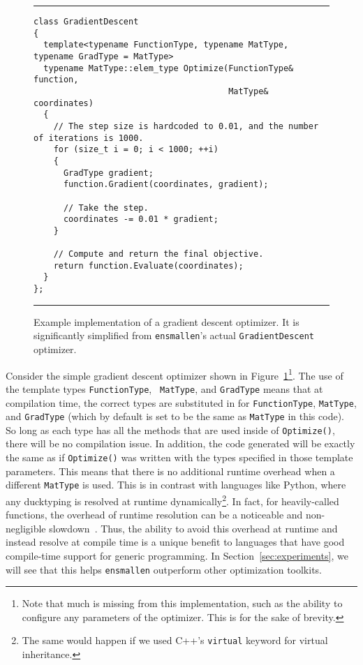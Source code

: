 \begin{figure}[t]
\hrule
\vspace{1ex}
\begin{verbatim}
class GradientDescent
{
  template<typename FunctionType, typename MatType, typename GradType = MatType>
  typename MatType::elem_type Optimize(FunctionType& function,
                                       MatType& coordinates)
  {
    // The step size is hardcoded to 0.01, and the number of iterations is 1000.
    for (size_t i = 0; i < 1000; ++i)
    {
      GradType gradient;
      function.Gradient(coordinates, gradient);

      // Take the step.
      coordinates -= 0.01 * gradient;
    }

    // Compute and return the final objective.
    return function.Evaluate(coordinates);
  }
};
\end{verbatim}
\hrule
\vspace*{-0.5em}
\caption{Example implementation of a gradient descent optimizer.  It is
significantly simplified from {\tt ensmallen}'s actual {\tt GradientDescent}
optimizer.}
\label{fig:gd}
\end{figure}

Consider the simple gradient descent optimizer shown in
Figure~\ref{fig:gd}\footnote{Note that much is missing from this implementation,
such as the ability to configure any parameters of the optimizer.  This is for
the sake of brevity.}.  The use of the template types {\tt FunctionType}, {\tt
MatType}, and {\tt GradType} means that at compilation time, the correct types are
substituted in for {\tt FunctionType}, {\tt MatType}, and {\tt GradType} (which
by default is set to be the same as {\tt MatType} in this code).  So long as
each type has all the methods that are used inside of {\tt Optimize()}, there
will be no compilation issue.  In addition, the code generated will be exactly
the same as if {\tt Optimize()} was written with the types specified in those
template parameters.  This means that there is no additional runtime overhead
when a different {\tt MatType} is used.  This is in contrast with languages like
Python, where any ducktyping is resolved at runtime dynamically\footnote{The
same would happen if we used C++'s {\tt virtual} keyword for virtual
inheritance.}.  In fact, for heavily-called functions, the overhead of runtime
resolution can be a noticeable and non-negligible slowdown~\cite{TODO}.
Thus, the ability to avoid this overhead at runtime and instead resolve at
compile time is a unique benefit to languages that have good compile-time
support for generic programming.  In Section~\ref{sec:experiments}, we will see
that this helps {\tt ensmallen} outperform other optimization toolkits.

